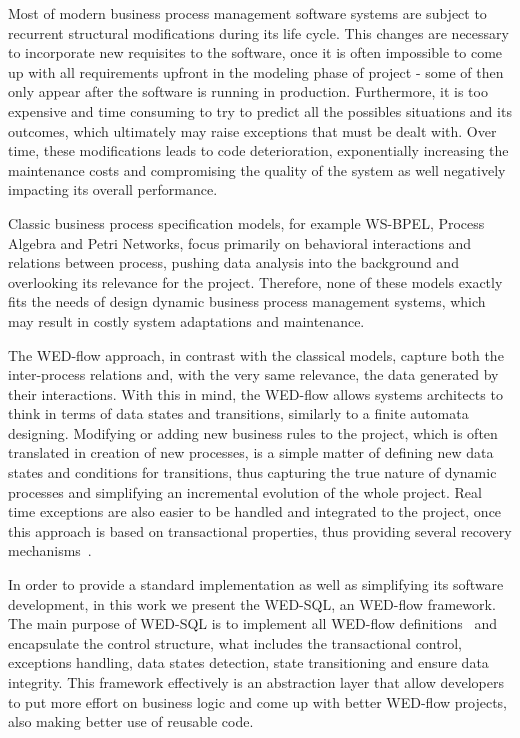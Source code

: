 \documentclass[conference]{IEEEtran}
\begin{document}
Most of modern business process management software systems are subject to recurrent structural modifications during its
life cycle. This changes are necessary to incorporate new requisites to the software, once it is often impossible 
to come up with all requirements upfront in the modeling phase of project - some of then only appear after the software
is running in production. Furthermore, it is too expensive and time consuming to try to predict all the possibles situations 
and its outcomes, which ultimately may raise exceptions that must be dealt with. Over time, these modifications leads
to code deterioration, exponentially increasing the maintenance costs and compromising the quality of the system as well 
negatively impacting its overall performance.

\par  Classic business process specification models, for example WS-BPEL, Process Algebra and Petri Networks, focus primarily
on behavioral interactions and relations between process, pushing data analysis into the background and overlooking its
relevance for the project. Therefore, none of these models exactly fits the needs of design dynamic business process 
management systems, which may result in costly system adaptations and maintenance.

\par  The WED-flow approach, in contrast with the classical models, capture both the inter-process relations and, with the very
same relevance, the data generated by their interactions. With this in mind, the WED-flow allows systems architects to 
think in terms of data states and transitions, similarly to a finite automata designing. Modifying or adding new business 
rules to the project, which is often translated in creation of new processes, is a simple matter of defining new data states 
and conditions for transitions, thus capturing the true nature of dynamic processes and simplifying an incremental evolution 
of the whole project. Real time exceptions are also easier to be handled and integrated to the project, once this approach
is based on transactional properties, thus providing several recovery mechanisms~\cite{ICWS12}.

\par In order to provide a standard implementation as well as simplifying its software development, in this work we present 
the WED-SQL, an WED-flow framework. The main purpose of WED-SQL is to implement all WED-flow definitions~\cite{FTPM10} and encapsulate 
the control structure, what includes the transactional control, exceptions handling, data states detection, state transitioning 
and ensure data integrity. This framework effectively is an abstraction layer that allow developers to put more effort
on business logic and come up with better WED-flow projects, also making better use of reusable code. 
\end{document}
